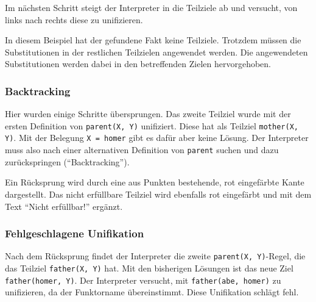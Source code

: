 \documentclass[parskip=full,11pt,twoside]{scrartcl}
\begin{document}
Im nächsten Schritt steigt der Interpreter in die Teilziele ab und versucht, von links nach rechts diese zu unifizieren.

\begin{minipage}{\linewidth}
\end{minipage}

In diesem Beispiel hat der gefundene Fakt keine Teilziele.
Trotzdem müssen die Substitutionen in der restlichen Teilzielen angewendet werden.
Die angewendeten Substitutionen werden dabei in den betreffenden Zielen hervorgehoben.

\subsubsection{Backtracking}

Hier wurden einige Schritte übersprungen.
Das zweite Teilziel wurde mit der ersten Definition von \texttt{parent(X, Y)} unifiziert.
Diese hat als Teilziel \texttt{mother(X, Y)}.
Mit der Belegung \texttt{X = homer} gibt es dafür aber keine Lösung.
Der Interpreter muss also nach einer alternativen Definition von \texttt{parent} suchen und dazu zurückspringen (\enquote{Backtracking}).

\begin{minipage}{\linewidth}
\end{minipage}

Ein Rücksprung wird durch eine aus Punkten bestehende, rot eingefärbte Kante dargestellt.
Das nicht erfüllbare Teilziel wird ebenfalls rot eingefärbt und mit dem Text \enquote{Nicht erfüllbar!} ergänzt.

\subsubsection{Fehlgeschlagene Unifikation}

Nach dem Rücksprung findet der Interpreter die zweite \texttt{parent(X, Y)}-Regel, die das Teilziel \texttt{father(X, Y)} hat.
Mit den bisherigen Lösungen ist das neue Ziel \texttt{father(homer, Y)}.
Der Interpreter versucht, mit \texttt{father(abe, homer)} zu unifizieren, da der Funktorname übereinstimmt.
Diese Unifikation schlägt fehl.
\end{document}
